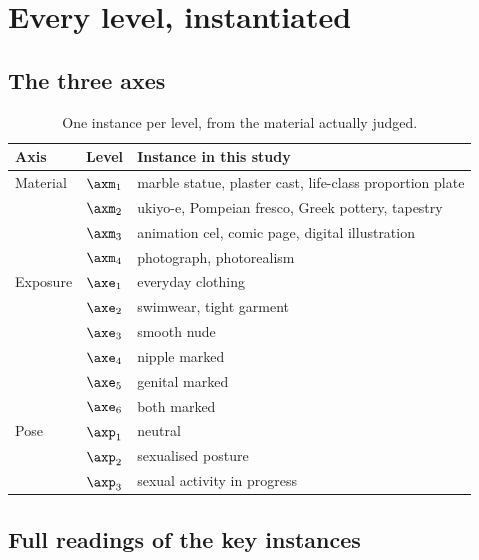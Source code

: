
\section{Every level, instantiated}
\label{app:instances}

\subsection{The three axes}

\begin{table}[H]
\centering\small
\begin{tabularx}{\linewidth}{@{}llX@{}}
\toprule
Axis & Level & Instance in this study \\
\midrule
Material & $\axm_1$ & marble statue, plaster cast, life-class proportion plate \\
 & $\axm_2$ & ukiyo-e, Pompeian fresco, Greek pottery, tapestry \\
 & $\axm_3$ & animation cel, comic page, digital illustration \\
 & $\axm_4$ & photograph, photorealism \\
\midrule
Exposure & $\axe_1$ & everyday clothing \\
 & $\axe_2$ & swimwear, tight garment \\
 & $\axe_3$ & smooth nude \\
 & $\axe_4$ & nipple marked \\
 & $\axe_5$ & genital marked \\
 & $\axe_6$ & both marked \\
\midrule
Pose & $\axp_1$ & neutral \\
 & $\axp_2$ & sexualised posture \\
 & $\axp_3$ & sexual activity in progress \\
\bottomrule
\end{tabularx}
\caption{One instance per level, from the material actually judged.}
\label{tab:instances}
\end{table}

\subsection{Full readings of the key instances}
\label{app:key}

